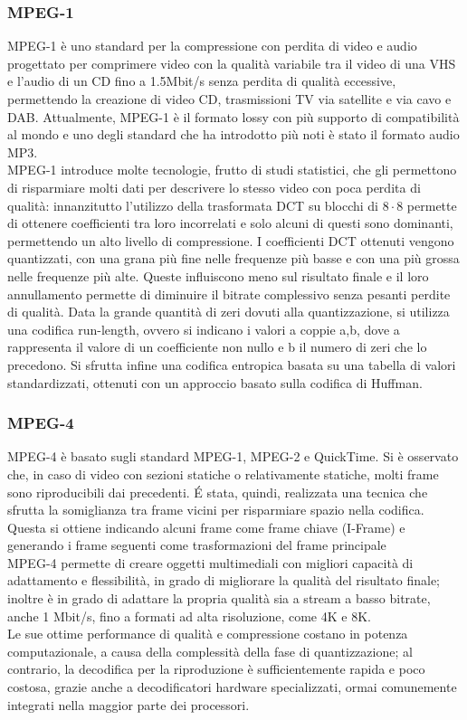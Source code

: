 			\subsubsection{MPEG-1}
			MPEG-1 è uno standard per la compressione con perdita di video e audio progettato per comprimere video con la qualità variabile tra il video di una \gls{VHS} e l'audio di un CD fino a 1.5Mbit/s senza perdita di qualità eccessive, permettendo la creazione di video CD, trasmissioni TV via satellite e via cavo e \gls{DAB}. Attualmente, MPEG-1 è il formato lossy con più supporto di compatibilità al mondo e uno degli standard che ha introdotto più noti è stato il formato audio MP3.
			\\
			MPEG-1 introduce molte tecnologie, frutto di studi statistici, che gli permettono di risparmiare molti dati per descrivere lo stesso video con poca perdita di qualità: innanzitutto l'utilizzo della trasformata DCT su blocchi di \(8\cdot8\) permette di ottenere coefficienti tra loro incorrelati e solo alcuni di questi sono dominanti, permettendo un alto livello di compressione. I coefficienti DCT ottenuti vengono quantizzati, con una grana più fine nelle frequenze più basse e con una più grossa nelle frequenze più alte. Queste influiscono meno sul risultato finale e il loro annullamento permette di diminuire il bitrate complessivo senza pesanti perdite di qualità.
			Data la grande quantità di zeri dovuti alla quantizzazione, si utilizza una codifica run-length, ovvero si indicano i valori a coppie a,b, dove a rappresenta il valore di un coefficiente non nullo e b il numero di zeri che lo precedono. Si sfrutta infine una codifica entropica basata su una tabella di valori standardizzati, ottenuti con un approccio basato sulla codifica di Huffman.

			\subsubsection{MPEG-4}
			MPEG-4 è basato sugli standard MPEG-1, MPEG-2 e QuickTime. Si è osservato che, in caso di video con sezioni statiche o relativamente statiche, molti frame sono riproducibili dai precedenti. É stata, quindi, realizzata una tecnica che sfrutta la somiglianza tra frame vicini per risparmiare spazio nella codifica. Questa si ottiene indicando alcuni frame come frame chiave (I-Frame) e generando i frame seguenti come trasformazioni del frame principale
			\\
			MPEG-4 permette di creare oggetti multimediali con migliori capacità di adattamento e flessibilità, in grado di migliorare la qualità del risultato finale; inoltre è in grado di adattare la propria qualità sia a stream a basso bitrate, anche 1 Mbit/s, fino a formati ad alta risoluzione, come 4K e 8K.
			\\
			Le sue ottime performance di qualità e compressione costano in potenza computazionale, a causa della complessità della fase di quantizzazione; al contrario, la decodifica per la riproduzione è sufficientemente rapida e poco costosa, grazie anche a decodificatori hardware specializzati, ormai comunemente integrati nella maggior parte dei processori.

